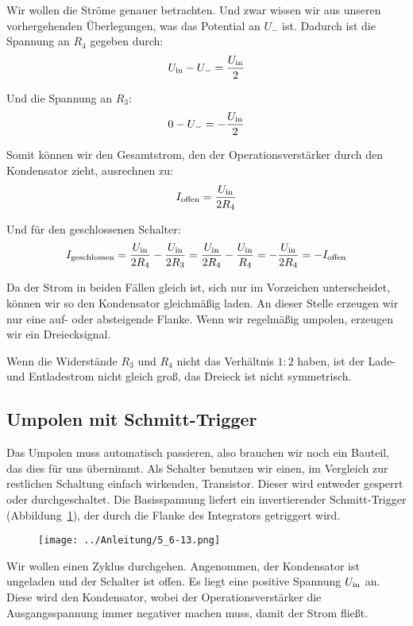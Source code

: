 Wir wollen die Ströme genauer betrachten. Und zwar wissen wir aus unseren
vorhergehenden Überlegungen, was das Potential an $U_-$ ist. Dadurch ist die
Spannung an $R_4$ gegeben durch:
\[
	U_\text{in} - U_- = \frac{U_\text{in}}2
\]

Und die Spannung an $R_3$:
\[
	0 - U_- = - \frac{U_\text{in}}2
\]

Somit können wir den Gesamtstrom, den der Operationsverstärker durch den
Kondensator zieht, ausrechnen zu:
\[
	I_\text{offen}
	= \frac{U_\text{in}}{2 R_4}
\]

Und für den geschlossenen Schalter:
\[
	I_\text{geschlossen}
	= \frac{U_\text{in}}{2 R_4} - \frac{U_\text{in}}{2 R_3}
	= \frac{U_\text{in}}{2 R_4} - \frac{U_\text{in}}{R_4}
	= - \frac{U_\text{in}}{2 R_4}
	= - I_\text{offen}
\]

Da der Strom in beiden Fällen gleich ist, sich nur im Vorzeichen unterscheidet,
können wir so den Kondensator gleichmäßig laden. An dieser Stelle erzeugen wir
nur eine auf- oder absteigende Flanke. Wenn wir regelmäßig umpolen, erzeugen
wir ein Dreiecksignal.

Wenn die Widerstände $R_3$ und $R_4$ nicht das Verhältnis $1:2$ haben, ist der
Lade- und Entladestrom nicht gleich groß, das Dreieck ist nicht symmetrisch.

\FloatBarrier
\subsection{Umpolen mit Schmitt-Trigger}

Das Umpolen muss automatisch passieren, also brauchen wir noch ein Bauteil, das
dies für uns übernimmt. Als Schalter benutzen wir einen, im Vergleich zur
restlichen Schaltung einfach wirkenden, Transistor. Dieser wird entweder
gesperrt oder durchgeschaltet. Die Basisspannung liefert ein invertierender
Schmitt-Trigger (Abbildung~\ref{fig:5_6-13}), der durch die Flanke des
Integrators getriggert wird.

\begin{figure}[htbp]
	\centering
	\texttt{[image: ../Anleitung/5\_6-13.png]}
	\caption{%
		\cite[Abbildung~5/6.13]{physik313-Anleitung}
	}
	\label{fig:5_6-13}
\end{figure}

Wir wollen einen Zyklus durchgehen. Angenommen, der Kondensator ist ungeladen
und der Schalter ist offen.
Es liegt eine positive Spannung $U_\text{in}$ an. Diese wird den Kondensator, wobei
der Operationsverstärker die Ausgangsspannung immer negativer machen muss,
damit der Strom fließt.

